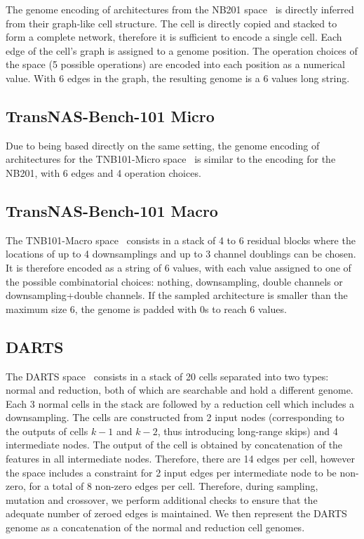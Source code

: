 \documentclass[10pt]{article} %
\begin{document}
The genome encoding of architectures from the NB201 space~\citep{dong2020bench} is directly inferred from their graph-like cell structure. The cell is directly copied and stacked to form a complete network, therefore it is sufficient to encode a single cell. Each edge of the cell's graph is assigned to a genome position. The operation choices of the space (5 possible operations) are encoded into each position as a numerical value. With 6 edges in the graph, the resulting genome is a 6 values long string.

\subsection{TransNAS-Bench-101 Micro}

Due to being based directly on the same setting, the genome encoding of architectures for the TNB101-Micro space~\citep{duan2021transnas} is similar to the encoding for the NB201, with 6 edges and 4 operation choices.

\subsection{TransNAS-Bench-101 Macro}

The TNB101-Macro space~\citep{duan2021transnas} consists in a stack of 4 to 6 residual blocks where the locations of up to 4 downsamplings and up to 3 channel doublings can be chosen. It is therefore encoded as a string of 6 values, with each value assigned to one of the possible combinatorial choices: nothing, downsampling, double channels or downsampling+double channels. If the sampled architecture is smaller than the maximum size 6, the genome is padded with 0s to reach 6 values.

\subsection{DARTS}

The DARTS space~\citep{liu2018darts} consists in a stack of 20 cells separated into two types: normal and reduction, both of which are searchable and hold a different genome. Each 3 normal cells in the stack are followed by a reduction cell which includes a downsampling. The cells are constructed from 2 input nodes (corresponding to the outputs of cells $k-1$ and $k-2$, thus introducing long-range skips) and 4 intermediate nodes. The output of the cell is obtained by concatenation of the features in all intermediate nodes. Therefore, there are 14 edges per cell, however the space includes a constraint for 2 input edges per intermediate node to be non-zero, for a total of 8 non-zero edges per cell. Therefore, during sampling, mutation and crossover, we perform additional checks to ensure that the adequate number of zeroed edges is maintained. We then represent the DARTS genome as a concatenation of the normal and reduction cell genomes.
\end{document}

